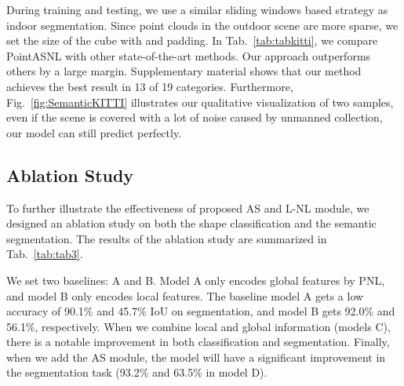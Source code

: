 \documentclass[10pt,twocolumn,letterpaper]{article}
\begin{document}
	During training and testing, we use a similar sliding windows based strategy as indoor segmentation. Since point clouds in the outdoor scene are more sparse, we set the size of the cube with   and  padding. In Tab.~\ref{tab:tabkitti}, we compare PointASNL with other state-of-the-art methods. Our approach outperforms others by a large margin. Supplementary material shows that our method achieves the best result in 13 of 19 categories. Furthermore, Fig.~\ref{fig:SemanticKITTI} illustrates our qualitative visualization of two samples, even if the scene is covered with a lot of noise caused by unmanned collection, our model can still predict perfectly.
	
	




	


	


	
	
	
	
	\subsection{Ablation Study}
	To further illustrate the effectiveness of proposed AS and L-NL module, we designed an ablation study on both the shape classification and the semantic segmentation. The results of the ablation study are summarized in Tab.~\ref{tab:tab3}.  
	
	We set two baselines: A and B. Model A only encodes global features by PNL, and model B only encodes local features. The baseline model A gets a low accuracy of 90.1\% and 45.7\% IoU on segmentation, and model B gets 92.0\% and 56.1\%, respectively. When we combine local and global information (models C), there is a notable improvement in both classification and segmentation. Finally, when we add the AS module, the model will have a significant improvement in the segmentation task (93.2\% and 63.5\% in model D). 
	
\end{document}
